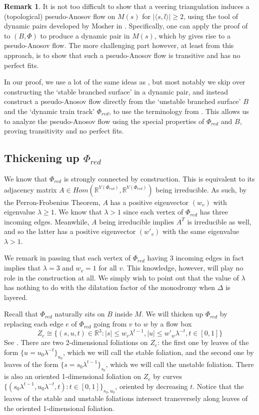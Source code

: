 \documentclass[12pt]{amsart}
\theoremstyle{definition}
\newtheorem{rmk}[thm]{Remark}
\numberwithin{equation}{section}
\begin{document}
\begin{rmk}
It is not too difficult to show that a veering triangulation induces a (topological) pseudo-Anosov flow on $M(s)$ for $|\langle s,l \rangle| \geq 2$, using the tool of dynamic pairs developed by Mosher in \cite{Mos96}. Specifically, one can apply the proof of \cite[Proposition 2.6.2]{Mos96} to $(B, \Phi)$ to produce a dynamic pair in $M(s)$, which by \cite[Theorem 3.4.1]{Mos96} gives rise to a pseudo-Anosov flow. The more challenging part however, at least from this approach, is to show that such a pseudo-Anosov flow is transitive and has no perfect fits. 

In our proof, we use a lot of the same ideas as \cite{Mos96}, but most notably we skip over constructing the `stable branched surface' in a dynamic pair, and instead construct a pseudo-Anosov flow directly from the `unstable branched surface' $B$ and the `dynamic train track' $\Phi_{red}$, to use the terminology from \cite{Mos96}. This allows us to analyze the pseudo-Anosov flow using the special properties of $\Phi_{red}$ and $B$, proving transitivity and no perfect fits.
\end{rmk}

\subsection{Thickening up $\Phi_{red}$}

We know that $\Phi_{red}$ is strongly connected by construction. This is equivalent to its adjacency matrix $A \in Hom(\mathbb{R}^{V(\Phi_{red})}, \mathbb{R}^{V(\Phi_{red})})$ being irreducible. As such, by the Perron-Frobenius Theorem, $A$ has a positive eigenvector $(w_v)$ with eigenvalue $\lambda \geq 1$. We know that $\lambda>1$ since each vertex of $\Phi_{red}$ has three incoming edges. Meanwhile, $A$ being irreducible implies $A^T$ is irreducible as well, and so the latter has a positive eigenvector $(w'_v)$ with the same eigenvalue $\lambda >1$.

We remark in passing that each vertex of $\Phi_{red}$ having $3$ incoming edges in fact implies that $\lambda=3$ and $w_v=1$ for all $v$. This knowledge, however, will play no role in the construction at all. We simply wish to point out that the value of $\lambda$ has nothing to do with the dilatation factor of the monodromy when $\Delta$ is layered.

Recall that $\Phi_{red}$ naturally sits on $B$ inside $M$. We will thicken up $\Phi_{red}$ by replacing each edge $e$ of $\Phi_{red}$ going from $v$ to $w$ by a flow box $$Z_e \cong \{(s,u,t) \in \mathbb{R}^3: |s|\leq w_v \lambda^{t-1}, |u| \leq w'_w \lambda^{-t}, t \in [0,1] \}$$ See . There are two 2-dimensional foliations on $Z_e$: the first one by leaves of the form $\{u=u_0 \lambda^{-t} \}_{u_0}$, which we will call the stable foliation, and the second one by leaves of the form $\{s=s_0 \lambda^{t-1}\}_{s_0}$, which we will call the unstable foliation. There is also an oriented 1-dimensional foliation on $Z_e$ by curves $\{(s_0\lambda^{t-1}, u_0\lambda^{-t},t): t \in [0,1]\}_{s_0,u_0}$, oriented by decreasing $t$. Notice that the leaves of the stable and unstable foliations intersect transversely along leaves of the oriented 1-dimensional foliation.
\end{document}
